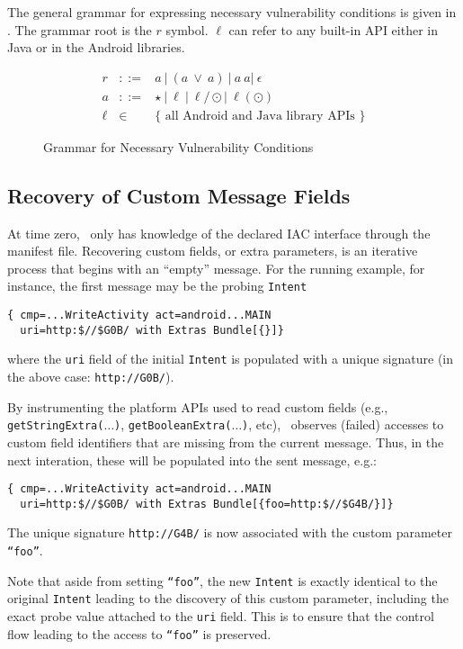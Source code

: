 The general grammar for expressing necessary vulnerability conditions is given in . The grammar root is the $r$ symbol. $\ell$ can refer to any built-in API either in Java or in the Android libraries.

\begin{figure}
	$$
	\begin{array}{rcl}
		r & ::= &  a\ |\ (a\ \vee\ a)\ |\  a\ a |\ \epsilon  \\
		a & ::= & \star\ |\ \ell\ |\ \ell / \odot |\ \ell(\odot) \\
		\ell & \in & \text{$\{$ all Android and Java library APIs $\}$}
	\end{array}
	$$
\caption{\label{Fi:grammar}Grammar for Necessary Vulnerability Conditions}
\end{figure}

\subsection{Recovery of Custom Message Fields}\label{Se:customparams}

At time zero, \Tool\ only has knowledge of the declared IAC interface through the manifest file. Recovering custom fields, or extra parameters, is an iterative process that begins with an ``empty'' message. For the running example, for instance, the first message may be the probing {\tt Intent}
\begin{lstlisting}[numbers=none]
{ cmp=...WriteActivity act=android...MAIN 
  uri=http:$//$G0B/ with Extras Bundle[{}]}
\end{lstlisting}
where the {\tt uri} field of the initial {\tt Intent} is populated with a unique signature (in the above case: {\tt http://G0B/}).

By instrumenting the platform APIs used to read custom fields (e.g., 
{\tt getStringExtra($\ldots$)}, {\tt getBooleanExtra($\ldots$)}, etc), \Tool\ observes (failed) accesses to custom field identifiers that are missing from the current message. Thus, in the next interation, these will be populated into the sent message, e.g.:
\begin{lstlisting}[numbers=none]
{ cmp=...WriteActivity act=android...MAIN 
  uri=http:$//$G0B/ with Extras Bundle[{foo=http:$//$G4B/}]}
\end{lstlisting}
The unique signature {\tt http://G4B/} is now associated with the custom parameter {\tt ``foo''}. 

Note that aside from setting {\tt ``foo''}, the new {\tt Intent} is exactly identical to the original {\tt Intent} leading to the discovery of this custom parameter, including the exact probe value attached to the {\tt uri} field. This is to ensure that the control flow leading to the access to {\tt ``foo''} is preserved.

